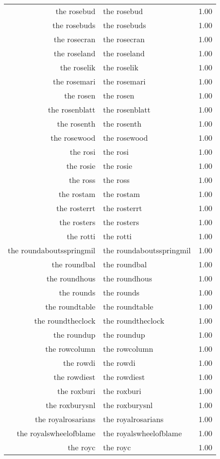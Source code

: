 \begin{table}[ht]
\begin{tabular}{rlr}
  the rosebud & the rosebud & 1.00 \\ 
  the rosebuds & the rosebuds & 1.00 \\ 
  the rosecran & the rosecran & 1.00 \\ 
  the roseland & the roseland & 1.00 \\ 
  the roselik & the roselik & 1.00 \\ 
  the rosemari & the rosemari & 1.00 \\ 
  the rosen & the rosen & 1.00 \\ 
  the rosenblatt & the rosenblatt & 1.00 \\ 
  the rosenth & the rosenth & 1.00 \\ 
  the rosewood & the rosewood & 1.00 \\ 
  the rosi & the rosi & 1.00 \\ 
  the rosie & the rosie & 1.00 \\ 
  the ross & the ross & 1.00 \\ 
  the rostam & the rostam & 1.00 \\ 
  the rosterrt & the rosterrt & 1.00 \\ 
  the rosters & the rosters & 1.00 \\ 
  the rotti & the rotti & 1.00 \\ 
  the roundaboutsspringmil & the roundaboutsspringmil & 1.00 \\ 
  the roundbal & the roundbal & 1.00 \\ 
  the roundhous & the roundhous & 1.00 \\ 
  the rounds & the rounds & 1.00 \\ 
  the roundtable & the roundtable & 1.00 \\ 
  the roundtheclock & the roundtheclock & 1.00 \\ 
  the roundup & the roundup & 1.00 \\ 
  the rowcolumn & the rowcolumn & 1.00 \\ 
  the rowdi & the rowdi & 1.00 \\ 
  the rowdiest & the rowdiest & 1.00 \\ 
  the roxburi & the roxburi & 1.00 \\ 
  the roxburysnl & the roxburysnl & 1.00 \\ 
  the royalrosarians & the royalrosarians & 1.00 \\ 
  the royalswheelofblame & the royalswheelofblame & 1.00 \\ 
  the royc & the royc & 1.00 \\ 

\end{tabular}
\end{table}
